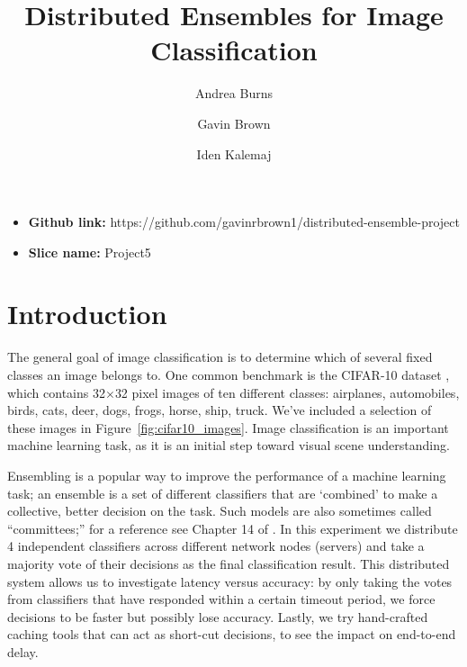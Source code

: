 \documentclass[11pt]{article}
\title{\vspace{-5ex} Distributed Ensembles for Image Classification}
\author{Andrea Burns \and Gavin Brown \and Iden Kalemaj}
\date{\vspace{-5ex}}
\begin{document}
\maketitle
\begin{itemize}
	\item \textbf{Github link:} https://github.com/gavinrbrown1/distributed-ensemble-project
	\item \textbf{Slice name:} Project5
\end{itemize}
\vspace{-2ex}
\section{Introduction}

The general goal of image classification is to determine which of several fixed classes an image belongs to. 
One common benchmark is the CIFAR-10 dataset \cite{cifar10}, which contains 32$\times$32 pixel images of ten different classes: airplanes, automobiles, birds, cats, deer, dogs, frogs, horse, ship, truck.
We've included a selection of these images in Figure~\ref{fig:cifar10_images}.
Image classification is an important machine learning task, as it is an initial step toward visual scene understanding. 

Ensembling is a popular way to improve the performance of a machine learning task; an ensemble is a set of different classifiers that are ‘combined’ to make a collective, better decision on the task. 
Such models are also sometimes called ``committees;'' for a reference see Chapter 14 of \cite{bishop}.
In this experiment we distribute 4 independent classifiers across different network nodes (servers) and take a majority vote of their decisions as the final classification result.
This distributed system allows us to investigate latency versus accuracy: by only taking the votes from classifiers that have responded within a certain timeout period, we force decisions to be faster but possibly lose accuracy.
Lastly, we try hand-crafted caching tools that can act as short-cut decisions, to see the impact on end-to-end delay.
\end{document}
